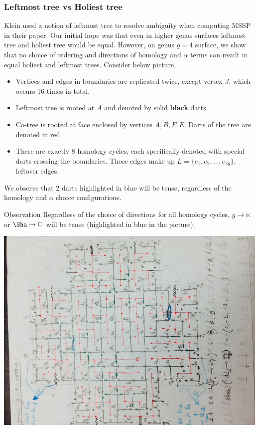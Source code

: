 \documentclass{article}
\begin{document}
\subsubsection{Leftmost tree vs Holiest tree}

Klein \cite{klein2005multiple} used a notion of leftmost tree to resolve ambiguity when 
computing MSSP in their paper.
Our initial hope was that even in higher genus surfaces leftmost tree and holiest
tree would be equal. However, on genus $g = 4$ surface, we show that no
choice of ordering and directions of homology and $\alpha$ terms can result in equal holiest and
leftmost trees. Consider below picture, \\
\begin{itemize}
\item Vertices and edges in boundaries are replicated twice, except vertex $J$, which occurs 16 times in total.
\item Leftmost tree is rooted at $A$ and denoted by solid \textbf{black} darts.
\item {\color{red} Co-tree} is rooted at face enclosed by vertices $A, B, F, E$. Darts of the tree are denoted in red.
\item There are exactly 8 homology cycles, each specifically denoted with
special darts crossing the boundaries. Those edges make up $L = \{e_1, e_2, \ldots, e_{2g}\}$, leftover edges.
\end{itemize}
We observe that 2 darts highlighted in blue will be tense, 
regardless of the homology and $\alpha$ choice configurations.
\begin{oneshot}{Observation}
Regardless of the choice of directions for all homology cycles, $g \rightarrow \ltimes$ or 
$\Sha \rightarrow \square$ will be tense (highlighted in {\color{blue} blue} in the picture). 
\end{oneshot}

\begin{center}
\includegraphics[angle = -90, scale = 0.7]{figures/Genus4_InitialHolyTree.jpg}
\end{center}
\end{document}
